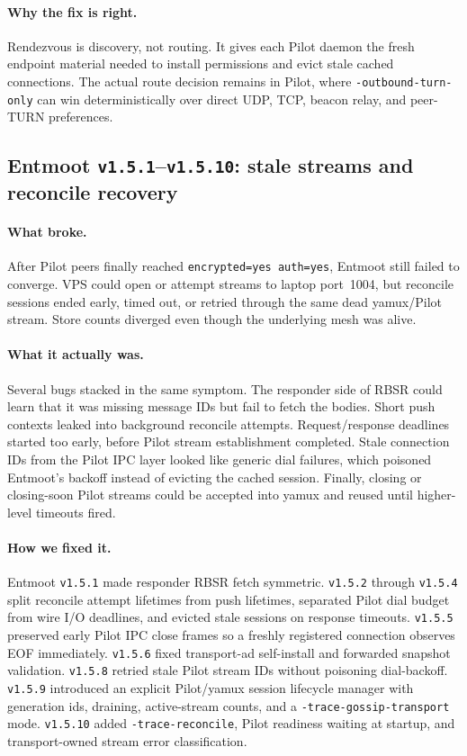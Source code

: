 \documentclass[11pt,a4paper]{article}
\begin{document}
\paragraph{Why the fix is right.} Rendezvous is discovery, not routing.
It gives each Pilot daemon the fresh endpoint material needed to
install permissions and evict stale cached connections. The actual
route decision remains in Pilot, where \texttt{-outbound-turn-only} can
win deterministically over direct UDP, TCP, beacon relay, and peer-TURN
preferences.

\subsection{Entmoot \texttt{v1.5.1}--\texttt{v1.5.10}: stale streams
and reconcile recovery}

\paragraph{What broke.} After Pilot peers finally reached
\texttt{encrypted=yes auth=yes}, Entmoot still failed to converge.
VPS could open or attempt streams to laptop port~1004, but reconcile
sessions ended early, timed out, or retried through the same dead
yamux/Pilot stream. Store counts diverged even though the underlying
mesh was alive.

\paragraph{What it actually was.} Several bugs stacked in the same
symptom. The responder side of RBSR could learn that it was missing
message IDs but fail to fetch the bodies. Short push contexts leaked
into background reconcile attempts. Request/response deadlines started
too early, before Pilot stream establishment completed. Stale
connection IDs from the Pilot IPC layer looked like generic dial
failures, which poisoned Entmoot's backoff instead of evicting the
cached session. Finally, closing or closing-soon Pilot streams could be
accepted into yamux and reused until higher-level timeouts fired.

\paragraph{How we fixed it.} Entmoot \texttt{v1.5.1} made responder
RBSR fetch symmetric. \texttt{v1.5.2} through \texttt{v1.5.4} split
reconcile attempt lifetimes from push lifetimes, separated Pilot dial
budget from wire I/O deadlines, and evicted stale sessions on response
timeouts. \texttt{v1.5.5} preserved early Pilot IPC close frames so a
freshly registered connection observes EOF immediately. \texttt{v1.5.6}
fixed transport-ad self-install and forwarded snapshot validation.
\texttt{v1.5.8} retried stale Pilot stream IDs without poisoning
dial-backoff. \texttt{v1.5.9} introduced an explicit Pilot/yamux
session lifecycle manager with generation ids, draining, active-stream
counts, and a \texttt{-trace-gossip-transport} mode. \texttt{v1.5.10}
added \texttt{-trace-reconcile}, Pilot readiness waiting at startup,
and transport-owned stream error classification.
\end{document}
